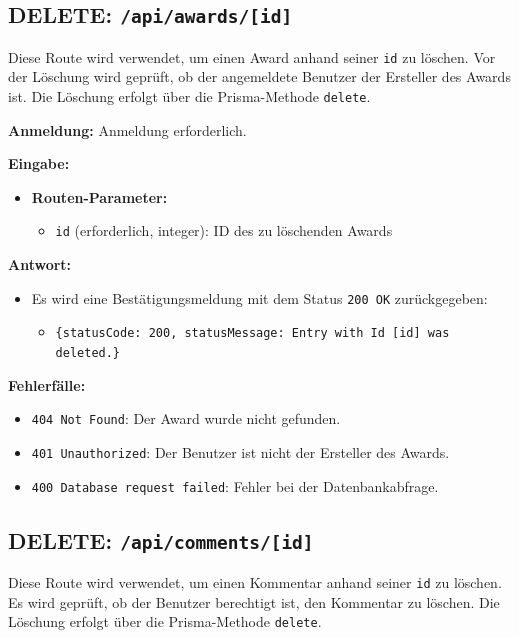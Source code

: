 \documentclass[a4paper,12pt]{article}
\begin{document}
\newpage
\subsection{DELETE: \texttt{/api/awards/[id]}}

Diese Route wird verwendet, um einen Award anhand seiner \texttt{id} zu
löschen. Vor der Löschung wird geprüft, ob der angemeldete Benutzer der
Ersteller des Awards ist. Die Löschung erfolgt über die Prisma-Methode
\texttt{delete}.

\textbf{Anmeldung:} Anmeldung erforderlich.

\textbf{Eingabe:}
\begin{itemize}
    \item \textbf{Routen-Parameter:}
    \begin{itemize}
        \item \texttt{id} (erforderlich, integer):
            ID des zu löschenden Awards
    \end{itemize}
\end{itemize}

\textbf{Antwort:}
\begin{itemize}
    \item Es wird eine Bestätigungsmeldung mit dem Status
        \texttt{200 OK} zurückgegeben:
    \begin{itemize}
        \item \texttt{\{statusCode: 200,
            statusMessage: Entry with Id [id] was deleted.\}}
    \end{itemize}
\end{itemize}

\textbf{Fehlerfälle:}
\begin{itemize}
    \item \texttt{404 Not Found}:
        Der Award wurde nicht gefunden.
    \item \texttt{401 Unauthorized}:
        Der Benutzer ist nicht der Ersteller des Awards.
    \item \texttt{400 Database request failed}:
        Fehler bei der Datenbankabfrage.
\end{itemize}

\newpage
\subsection{DELETE: \texttt{/api/comments/[id]}}

Diese Route wird verwendet, um einen Kommentar anhand seiner \texttt{id} zu
löschen. Es wird geprüft, ob der Benutzer berechtigt ist, den Kommentar zu
löschen. Die Löschung erfolgt über die Prisma-Methode \texttt{delete}.
\end{document}
